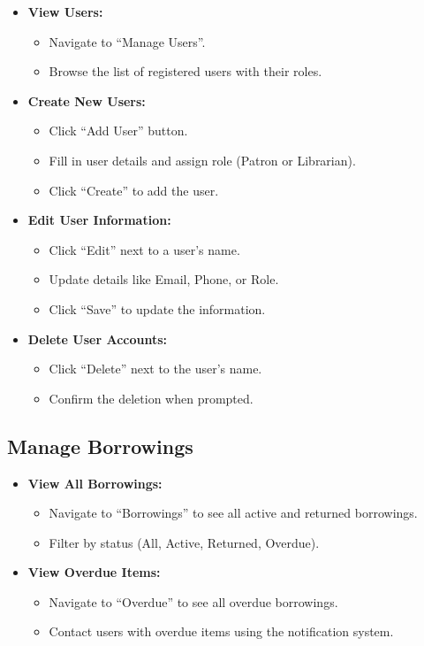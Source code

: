 \documentclass[11pt,a4paper]{article}
\begin{document}
\begin{itemize}
    \item \textbf{View Users:}
    \begin{itemize}
        \item Navigate to ``Manage Users''.
        \item Browse the list of registered users with their roles.
    \end{itemize}

    \item \textbf{Create New Users:}
    \begin{itemize}
        \item Click ``Add User'' button.
        \item Fill in user details and assign role (Patron or Librarian).
        \item Click ``Create'' to add the user.
    \end{itemize}

    \item \textbf{Edit User Information:}
    \begin{itemize}
        \item Click ``Edit'' next to a user's name.
        \item Update details like Email, Phone, or Role.
        \item Click ``Save'' to update the information.
    \end{itemize}

    \item \textbf{Delete User Accounts:}
    \begin{itemize}
        \item Click ``Delete'' next to the user's name.
        \item Confirm the deletion when prompted.
    \end{itemize}
\end{itemize}

\subsection{Manage Borrowings}

\begin{itemize}
    \item \textbf{View All Borrowings:}
    \begin{itemize}
        \item Navigate to ``Borrowings'' to see all active and returned borrowings.
        \item Filter by status (All, Active, Returned, Overdue).
    \end{itemize}

    \item \textbf{View Overdue Items:}
    \begin{itemize}
        \item Navigate to ``Overdue'' to see all overdue borrowings.
        \item Contact users with overdue items using the notification system.
    \end{itemize}
\end{itemize}
\end{document}
